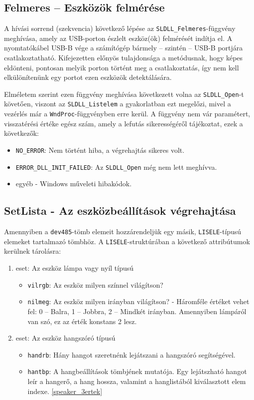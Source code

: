 \documentclass[tocnopagenum]{thesis-ekf}
\begin{document}
	\subsection{Felmeres -- Eszközök felmérése}
	A hívási sorrend (szekvencia) következő lépése az \verb*|SLDLL_Felmeres|-függvény meghívása, amely az USB-porton észlelt eszköz(ök) felmérését indítja el. A nyomtatókábel USB-B vége a számítógép bármely -- szintén -- USB-B portjára csatlakoztatható. Kifejezetten előnyös tulajdonsága a metódusnak, hogy képes eldönteni, pontosan melyik porton történt meg a csatlakoztatás, így nem kell elkülönítenünk egy portot ezen eszközök detektálására.
	
	Elméletem szerint ezen függvény meghívása következett volna az \verb*|SLDLL_Open|-t követően, viszont az \verb*|SLDLL_Listelem| a gyakorlatban ezt megelőzi, mivel a vezérlés már a \verb*|WndProc|-függvényben erre kerül.  A függvény nem vár paramétert, visszatérési értéke egész szám, amely a lefutás sikerességéről tájékoztat, ezek a következők:
	\begin{itemize}
		\item \verb*|NO_ERROR|: Nem történt hiba, a végrehajtás sikeres volt.
		\item \verb*|ERROR_DLL_INIT_FAILED|: Az \verb*|SLDLL_Open| még nem lett meghívva.
		\item egyéb - Windows műveleti hibakódok.
	\end{itemize}
	\subsection{SetLista - Az eszközbeállítások végrehajtása}
	Amennyiben a \verb*|dev485|-tömb elemeit hozzárendeljük egy másik, \verb*|LISELE|-típusú elemeket tartalmazó tömbhöz. A \verb*|LISELE|-struktúrában a következő attribútumok kerülnek tárolásra: 
	\begin{enumerate}
		\item eset: Az eszköz lámpa vagy nyíl típusú
		\begin{itemize}
			\item \verb*|vilrgb|: Az eszköz milyen színnel világítson?
			\item \verb*|nilmeg|: Az eszköz milyen irányban világítson? - Háromféle értéket vehet fel: 0 -- Balra, 1 -- Jobbra, 2 -- Mindkét irányban. Amennyiben lámpáról van szó, ez az érték konstans 2 lesz.
		\end{itemize}
		\item eset: Az eszköz hangszóró típusú
		\begin{itemize}
			\item \verb*|handrb|: Hány hangot szeretnénk lejátszani a hangszóró segítségével.
			\item \verb*|hantbp|: A hangbeállítások tömbjének mutatója. Egy lejátszható hangot leír a hangerő, a hang hossza, valamint a hanglistából kiválasztott elem indexe. \ref{speaker_3ertek}
		\end{itemize}
	\end{enumerate}
\end{document}
